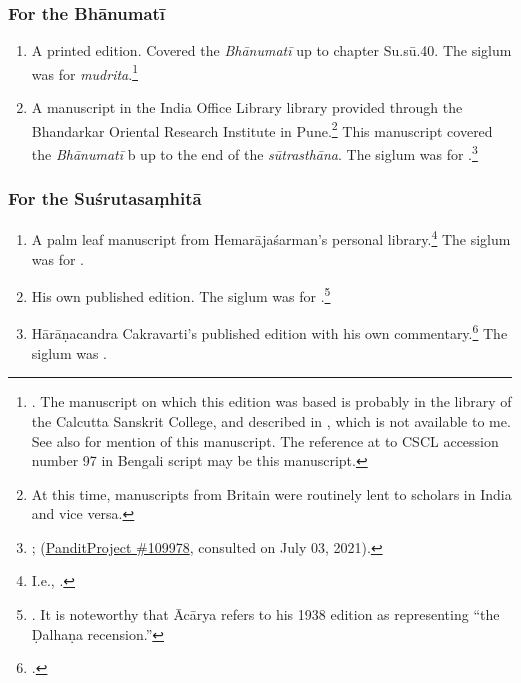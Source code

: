 \subsubsection{For the Bhānumatī}

\begin{enumerate}
    \item A printed edition.  Covered the \emph{Bhānumatī} up to chapter Su.sū.40.
    The siglum was  for \emph{mudrita}.\footnote{\cite{sena-1886}.  
    The
    manuscript on which this edition was based is probably in the library of the
    Calcutta Sanskrit College, and described in \cite[v.\,X.1]{sast-1917}, which
    is not available to me.  See also \cite[IB, 495, n.\,57]{meul-hist} for
    mention of this manuscript.  The reference at \cite[217]{rao-sans} to CSCL
    accession number 97 in Bengali script may be this manuscript.}
    
    \item A manuscript in the India Office Library library provided through the
    Bhandarkar Oriental Research Institute in Pune.\footnote{At this time,
    manuscripts from Britain were routinely lent to scholars in India and vice
    versa.} This manuscript covered the \emph{Bhānumatī} b up to the end of the
    \emph{sūtrasthāna}.  The siglum was  for
    .\footnote{\cite{PP109978}; 
    (\href{panditproject.org/entity/109978/manuscript}{PanditProject \#109978},
    consulted on July 03, 2021).}
\end{enumerate}

\subsubsection{For the Suśrutasaṃhitā}

\begin{enumerate}
    \item A palm leaf manuscript from Hemarājaśarman's personal
    library.\footnote{I.e., .}  The siglum was
     for .
    
    \item His own published edition. The siglum was  for 
    .\footnote{\cite{vulgate}.  It is noteworthy that Ācārya refers to
    his 1938 edition as representing “the Ḍalhaṇa recension.”}
    
    \item Hārāṇacandra Cakravarti's published edition with his own
    commentary.\footcite{bhat-1917} The siglum was .
\end{enumerate}
%

